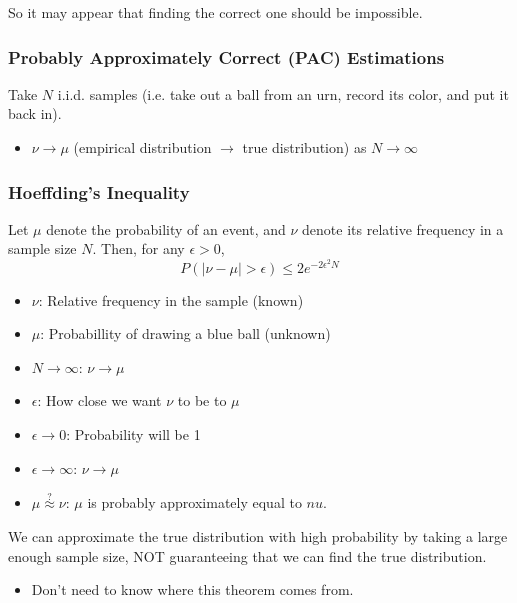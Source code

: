 \begin{notes}
    So it may appear that finding the correct one should be impossible. 
\end{notes}

\subsubsection{Probably Approximately Correct (PAC) Estimations}
\begin{example}
    Take $N$ i.i.d. samples (i.e. take out a ball from an urn, record its color, and put it back in).
    \begin{itemize}
        \item $\nu \rightarrow \mu$ (empirical distribution $\rightarrow$ true distribution) as $N \rightarrow \infty$
    \end{itemize}
\end{example}

\subsubsection{Hoeffding's Inequality}
\begin{definition}
    Let $\mu$ denote the probability of an event, and $\nu$ denote its relative frequency in a sample size $N$. Then, for any $\epsilon > 0$,
    \begin{equation}
        P(|\nu - \mu| > \epsilon) \leq 2e^{-2\epsilon^2N}
    \end{equation}
    \begin{itemize}
        \item $\nu$: Relative frequency in the sample (known)
        \item $\mu$: Probabillity of drawing a blue ball (unknown)
        \item $N \rightarrow \infty$: $\nu \rightarrow \mu$
        \item $\epsilon$: How close we want $\nu$ to be to $\mu$
        \item $\epsilon \rightarrow 0$: Probability will be 1
        \item $\epsilon \rightarrow \infty$: $\nu \rightarrow \mu$
        \item $\mu \overset{?}{\approx} \nu $: $\mu$ is probably approximately equal to $nu$.
    \end{itemize}
\end{definition}

\begin{warning}
    We can approximate the true distribution with high probability by taking a large enough sample size, NOT guaranteeing that we can find the true distribution.
    \begin{itemize}
        \item Don't need to know where this theorem comes from.
    \end{itemize}
\end{warning}

